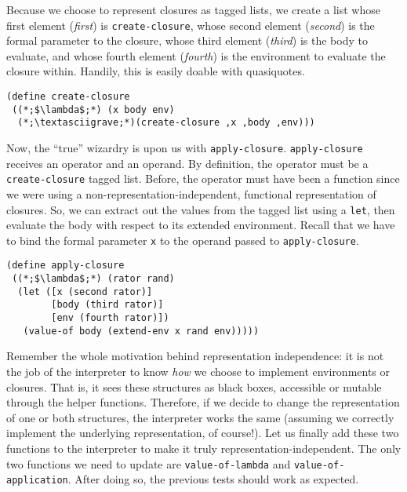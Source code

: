 Because we choose to represent closures as tagged lists, we create a list whose first element (\textit{first}) is \texttt{\textquotesingle{}create-closure}, whose second element (\textit{second}) is the formal parameter to the closure, whose third element (\textit{third}) is the body to evaluate, and whose fourth element (\textit{fourth}) is the environment to evaluate the closure within. Handily, this is easily doable with quasiquotes.

\begin{cl}[]{}\begin{lstlisting}[language=MyScheme]
(define create-closure
 ((*;$\lambda$;*) (x body env)
  (*;\textasciigrave;*)(create-closure ,x ,body ,env)))
\end{lstlisting}\end{cl}

Now, the ``true'' wizardry is upon us with \texttt{apply-closure}. \texttt{apply-closure} receives an operator and an operand. By definition, the operator must be a \texttt{create-closure} tagged list. Before, the operator must have been a function since we were using a non-representation-independent, functional representation of closures. So, we can extract out the values from the tagged list using a \texttt{let}, then evaluate the body with respect to its extended environment. Recall that we have to bind the formal parameter \texttt{x} to the operand passed to \texttt{apply-closure}.

\begin{cl}[]{}\begin{lstlisting}[language=MyScheme]
(define apply-closure
 ((*;$\lambda$;*) (rator rand)
  (let ([x (second rator)]
        [body (third rator)]
        [env (fourth rator)])
   (value-of body (extend-env x rand env)))))
\end{lstlisting}\end{cl}

Remember the whole motivation behind representation independence: it is not the job of the interpreter to know \textit{how} we choose to implement environments or closures. That is, it sees these structures as black boxes, accessible or mutable through the helper functions. Therefore, if we decide to change the representation of one or both structures, the interpreter works the same (assuming we correctly implement the underlying representation, of course!). Let us finally add these two functions to the interpreter to make it truly representation-independent. The only two functions we need to update are \texttt{value-of-lambda} and \texttt{value-of-application}. After doing so, the previous tests should work as expected.

